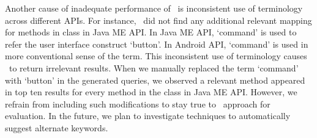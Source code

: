 Another cause of inadequate performance of \tool\ is 
inconsistent use of terminology across different APIs.
For instance, \tool\ did not find any additional relevant mapping for methods in  class in Java ME API.
In Java ME API, `command' is used to refer the user interface construct `button'.
In Android API, `command' is used in more conventional sense of the term.
This inconsistent use of terminology causes \tool\ to return irrelevant results. 
When we manually replaced the term `command' with `button' in the generated queries,
we observed a relevant method appeared in top ten results for every method in the  class in Java ME API.
However, we refrain from including such modifications to stay true to \tool\ approach for evaluation.
In the future, we plan to investigate techniques to automatically suggest alternate keywords.


